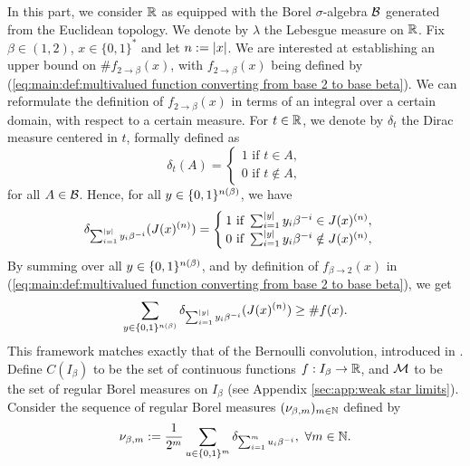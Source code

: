 In this part, we consider $\mathbb{R}$ as equipped with the Borel $\sigma$-algebra $\mathcal{B}$ generated from the Euclidean topology. We denote by $\lambda$ the Lebesgue measure on $\mathbb{R}$. Fix $\beta \in (1,2)$, $x \in \{0,1\}^\ast$ and let $n := \left| x \right|$. We are interested at establishing an upper bound on $\#f_{2\to \beta}(x)$, with $f_{2\to \beta}(x)$ being defined by (\ref{eq:main:def:multivalued function converting from base 2 to base beta}). We can reformulate the definition of $f_{2\to \beta}(x)$ in terms of an integral over a certain domain, with respect to a certain measure. For $t \in \mathbb{R}$, we denote by $\delta_t$ the Dirac measure centered in $t$, formally defined as
\begin{equation}\label{eq:0:introduction to the formalism of Bernoulli convolution}
    \delta_t(A) = \begin{cases}
        1 \text{ if } t \in A,\\
        0 \text{ if } t \notin A,
    \end{cases}
\end{equation}
for all $A \in \mathcal{B}$. Hence, for all $y \in \{0,1\}^{n(\beta)}$, we have
\begin{equation}\label{eq:1:introduction to the formalism of Bernoulli convolution}
    \delta_{\sum_{i=1}^{\left| y \right|} y_i \beta^{-i}}(J(x)^{(n)}) = \begin{cases}
        1 \text{ if } \sum_{i=1}^{\left| y \right|} y_i \beta^{-i} \in J(x)^{(n)},\\
        0 \text{ if } \sum_{i=1}^{\left| y \right|} y_i \beta^{-i} \notin J(x)^{(n)},
    \end{cases}
\end{equation}
By summing over all $y \in \{0,1\}^{n(\beta)}$, and by definition of $f_{\beta \to 2}(x)$ in (\ref{eq:main:def:multivalued function converting from base 2 to base beta}), we get
\begin{equation}\label{eq:2:introduction to the formalism of Bernoulli convolution}
    \sum_{y \in \{0,1\}^{n(\beta)}}\delta_{\sum_{i=1}^{\left| y \right|} y_i \beta^{-i}}(J(x)^{(n)}) \geq \#f(x).
\end{equation}
This framework matches exactly that of the Bernoulli convolution, introduced in \cite[Section 6]{jessenDistributionFunctionsRiemann}. Define $C(I_\beta)$ to be the set of continuous functions $f : I_\beta \to \mathbb{R}$, and $\mathcal{M}$ to be the set of regular Borel measures on $I_\beta$ (see Appendix \ref{sec:app:weak star limits}). Consider the sequence of regular Borel measures $(\nu_{\beta,m})_{m \in \mathbb{N}}$ defined by 
\begin{equation}\label{eq:3:introduction to the formalism of Bernoulli convolution}
    \nu_{\beta,m} := \frac{1}{2^m} \sum_{u \in \{0,1\}^{m}} \delta_{\sum_{i=1}^{m} u_i \beta^{-i}}, \ \forall m \in \mathbb{N}.
\end{equation}
